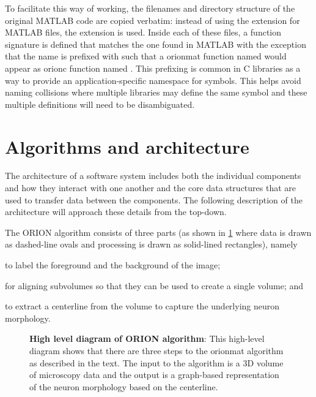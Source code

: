 To facilitate this way of working, the filenames and directory
structure of the original MATLAB code are copied verbatim: instead
of using the  extension for MATLAB files, the
 extension is used. Inside each of these
 files, a function signature is defined that
matches the one found in MATLAB with the exception that the name
is prefixed with  such that a \gls{orionmat}
function named  would appear as
\gls{orionc} function named .
This prefixing is common in C libraries as a way to provide
an application-specific namespace for symbols. This helps avoid
naming collisions where multiple libraries may define the same
symbol and these multiple definitions will need to be disambiguated.

\section{Algorithms and architecture}

The architecture of a software system includes both the individual
components and how they interact with one another and the core
data structures that are used to transfer data between the
components. The following description of the architecture will
approach these details from the top-down.

The ORION algorithm consists of three parts (as shown in
\cref{fig:high-level-arch} where data is drawn as dashed-line
ovals and processing is drawn as solid-lined rectangles),
namely
\begin{description}[font=\textpluscolon]
	\item[Segmentation] to label the
		foreground and the background of the image;
	\item[Registration] for aligning subvolumes so
		that they can be used to create a single volume;
		and
	\item[Tracing] to extract a centerline from the volume to
		capture the underlying neuron morphology.
\end{description}

\begin{figure}
\centering
\resizebox{1.0\textwidth}{!}{}
\caption[High level diagram of ORION algorithm]{\textbf{High level
diagram of ORION algorithm}: This high-level diagram shows that
there are three steps to the \gls{orionmat} algorithm as described
in the text. The input to the algorithm is a 3D volume of
microscopy data and the output is a graph-based representation of
the neuron morphology based on the centerline.}\label{fig:high-level-arch}
\end{figure}

